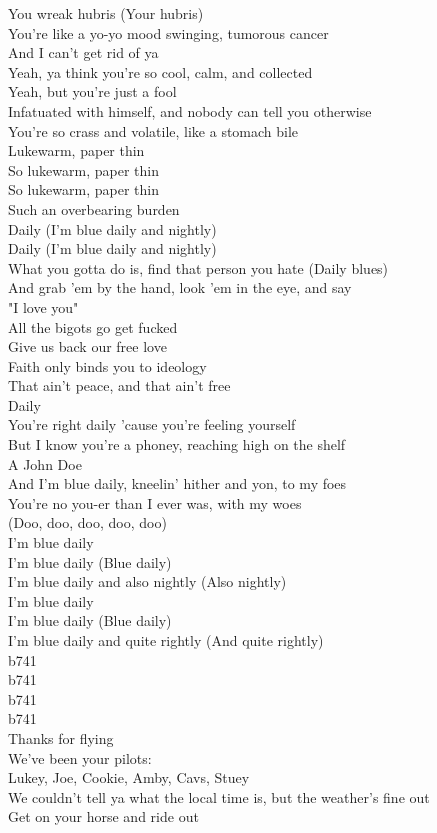 You wreak hubris (Your hubris)\\
You're like a yo-yo mood swinging, tumorous cancer\\
And I can't get rid of ya\\
Yeah, ya think you're so cool, calm, and collected\\
Yeah, but you're just a fool\\
Infatuated with himself, and nobody can tell you otherwise\\
You're so crass and volatile, like a stomach bile\\
Lukewarm, paper thin\\
So lukewarm, paper thin\\
So lukewarm, paper thin\\
Such an overbearing burden\\

Daily (I'm blue daily and nightly)\\
Daily (I'm blue daily and nightly)\\

What you gotta do is, find that person you hate (Daily blues)\\
And grab 'em by the hand, look 'em in the eye, and say\\
"I love you"\\
All the bigots go get fucked\\
Give us back our free love\\
Faith only binds you to ideology\\
That ain't peace, and that ain't free\\
Daily\\

You're right daily 'cause you're feeling yourself\\
But I know you're a phoney, reaching high on the shelf\\
A John Doe\\
And I'm blue daily, kneelin' hither and yon, to my foes\\
You're no you-er than I ever was, with my woes\\

(Doo, doo, doo, doo, doo)\\
I'm blue daily\\
I'm blue daily (Blue daily)\\
I'm blue daily and also nightly (Also nightly)\\
I'm blue daily\\
I'm blue daily (Blue daily)\\
I'm blue daily and quite rightly (And quite rightly)\\

b741\\
b741\\
b741\\
b741\\
Thanks for flying\\
We've been your pilots:\\
Lukey, Joe, Cookie, Amby, Cavs, Stuey\\
We couldn't tell ya what the local time is, but the weather's fine out\\
Get on your horse and ride out\\
